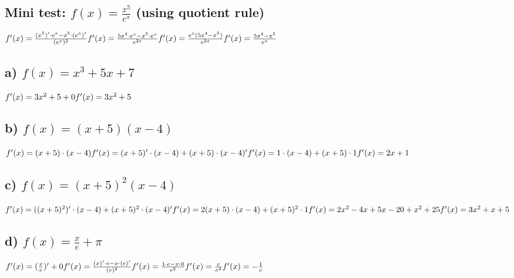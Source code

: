 \documentclass{article}
\begin{document}
\subsection{Mini test: $f(x) = \frac{x^5}{e^x}$ (using quotient rule)}
$
  f'(x) = \frac{(x^5)' \cdot e^x - x^5 \cdot (e^x)'}{(e^x)^2}
  \\
  \\
  f'(x) = \frac{5x^4 \cdot e^x - x^5 \cdot e^x}{e^{2x}}
  \\
  \\
  f'(x) = \frac{e^x (5x^4 - x^5)}{e^{2x}}
  \\
  \\
  f'(x) = \frac{5x^4 - x^5}{e^x}
$

\subsection{a) $f(x) = x^3 + 5x + 7$}
$
f'(x) = 3x^2 + 5 + 0
\\
\\
f'(x) = 3x^2 + 5
$

\subsection{b) $f(x) = (x+5)(x-4)$}
$
f'(x) = (x+5) \cdot (x-4)
\\
\\
f'(x) = (x+5)' \cdot (x-4) + (x+5) \cdot (x-4)'
\\
\\
f'(x) = 1 \cdot (x-4) + (x+5) \cdot 1
\\
\\
f'(x) = 2x + 1
$

\subsection{c) $f(x) = (x+5)^2(x-4)$}
$
f'(x) = ((x+5)^2)' \cdot (x-4) + (x+5)^2 \cdot (x-4)'
\\
\\
f'(x) = 2(x+5) \cdot (x-4) + (x+5)^2 \cdot 1
\\
\\
f'(x) = 2x^2 - 4x + 5x - 20 + x^2 + 25
\\
\\
f'(x) = 3x^2 + x + 5
$

\pagebreak

\subsection{d) $f(x) = \frac{x}{e} + \pi $}
$
f'(x) = (\frac{x}{e})' + 0
\\
\\
f'(x) = \frac{(x)' \cdot e - x \cdot (e)'}{(e)^2}
\\
\\
f'(x) = \frac{1 \cdot e - x \cdot 0}{e^2}
\\
\\
f'(x) = \frac{e}{e^2}
\\
\\
f'(x) = - \frac{1}{e}
$
\end{document}
